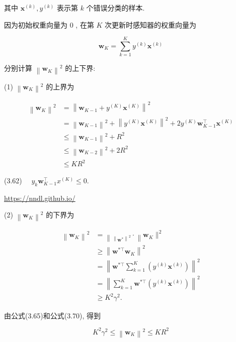 \documentclass[10pt]{article}
\begin{document}
其中 $\boldsymbol{x}^{(k)}, y^{(k)}$ 表示第 $k$ 个错误分类的样本.

因为初始权重向量为 0 , 在第 $K$ 次更新时感知器的权重向量为


\begin{equation*}
\boldsymbol{w}_{K}=\sum_{k=1}^{K} y^{(k)} \boldsymbol{x}^{(k)} \tag{3.60}
\end{equation*}


分别计算 $\left\|\boldsymbol{w}_{K}\right\|^{2}$ 的上下界:

(1) $\left\|\boldsymbol{w}_{K}\right\|^{2}$ 的上界为


\begin{align*}
\left\|\boldsymbol{w}_{K}\right\|^{2} & =\left\|\boldsymbol{w}_{K-1}+y^{(K)} \boldsymbol{x}^{(K)}\right\|^{2}  \tag{3.61}\\
& =\left\|\boldsymbol{w}_{K-1}\right\|^{2}+\left\|y^{(K)} \boldsymbol{x}^{(K)}\right\|^{2}+2 y^{(K)} \boldsymbol{w}_{K-1}^{\top} \boldsymbol{x}^{(K)} \\
& \leq\left\|\boldsymbol{w}_{K-1}\right\|^{2}+R^{2}  \tag{3.63}\\
& \leq\left\|\boldsymbol{w}_{K-2}\right\|^{2}+2 R^{2}  \tag{3.64}\\
& \leq K R^{2} \tag{3.65}
\end{align*}


(3.62) $\quad y_{k} \boldsymbol{w}_{K-1}^{\top} x^{(K)} \leq 0$.

\href{https://nndl.github.io/}{https://nndl.github.io/}

(2) $\left\|\boldsymbol{w}_{K}\right\|^{2}$ 的下界为


\begin{align*}
\left\|\boldsymbol{w}_{K}\right\|^{2} & =\left\|_{\left\|\boldsymbol{w}^{*}\right\|^{2}} \cdot\right\| \boldsymbol{w}_{K} \|^{2}  \tag{3.66}\\
& \geq\left\|\boldsymbol{w}^{* \top} \boldsymbol{w}_{K}\right\|^{2}  \tag{3.67}\\
& =\left\|\boldsymbol{w}^{* \top} \sum_{k=1}^{K}\left(y^{(k)} \boldsymbol{x}^{(k)}\right)\right\|^{2}  \tag{3.68}\\
& =\left\|\sum_{k=1}^{K} \boldsymbol{w}^{* \top}\left(y^{(k)} \boldsymbol{x}^{(k)}\right)\right\|^{2}  \tag{3.69}\\
& \geq K^{2} \gamma^{2} . \tag{3.70}
\end{align*}


由公式(3.65)和公式(3.70), 得到


\begin{equation*}
K^{2} \gamma^{2} \leq\left\|\boldsymbol{w}_{K}\right\|^{2} \leq K R^{2} \tag{3.71}
\end{equation*}
\end{document}
